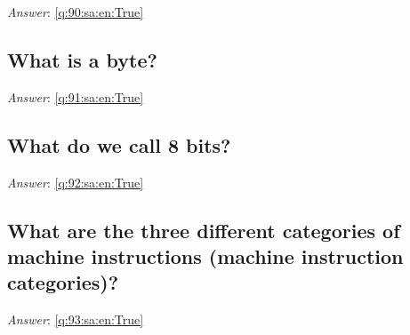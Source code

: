 \documentclass[a4paper,11pt,oneside]{article}
\begin{document}
\begin{sloppypar}
\label{q:90:sa:en:False}

\vspace{2cm}

\noindent\makebox[\textwidth]{\hrulefill}

\vspace{1cm}

\textit{Answer}: \autoref{q:90:sa:en:True}



\subsection{What is a byte?}

\label{q:91:sa:en:False}

\vspace{2cm}

\noindent\makebox[\textwidth]{\hrulefill}

\vspace{1cm}

\textit{Answer}: \autoref{q:91:sa:en:True}



\subsection{What do we call 8 bits?}

\label{q:92:sa:en:False}

\vspace{2cm}

\noindent\makebox[\textwidth]{\hrulefill}

\vspace{1cm}

\textit{Answer}: \autoref{q:92:sa:en:True}



\subsection{What are the three different categories of machine instructions (machine instruction categories)?}

\label{q:93:sa:en:False}

\vspace{2cm}

\noindent\makebox[\textwidth]{\hrulefill}

\vspace{1cm}

\textit{Answer}: \autoref{q:93:sa:en:True}




\end{sloppypar}
\end{document}
